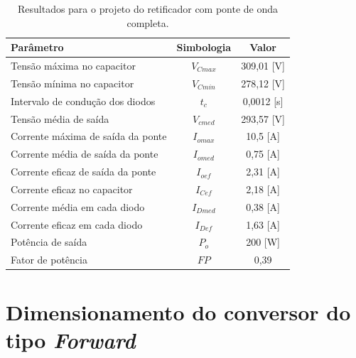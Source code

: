 \begin{apendicesenv}
\begin{table}[H]
    \centering
    \caption{Resultados para o projeto do retificador com ponte de onda completa.}
    \label{retificador_resultados}
    \begin{adjustbox}{max width = \textwidth}
        \begin{tabular}{|l|c|c|}
            \hline
            \rowcolor[HTML]{A8DADC}
            \textbf{Parâmetro} & \textbf{Simbologia} & \textbf{Valor}
            \\ \hline
            Tensão máxima no capacitor & $V_{Cmax}$ &  309,01 [V]
             \\ \hline
            Tensão mínima no capacitor & $V_{Cmin}$ &  278,12 [V]
             \\ \hline
            Intervalo de condução dos diodos & $t_{c}$ &  0,0012 [s]
             \\ \hline
            Tensão média de saída & $V_{cmed}$ & 293,57 [V]
             \\ \hline
            Corrente máxima de saída da ponte & $I_{omax}$ & 10,5 [A]
             \\ \hline
            Corrente média de saída da ponte & $I_{omed}$ &  0,75 [A]
             \\ \hline
            Corrente eficaz de saída da ponte & $I_{oef}$ & 2,31 [A]
             \\ \hline
            Corrente eficaz no capacitor & $I_{Cef}$ &  2,18 [A]
             \\ \hline
            Corrente média em cada diodo & $I_{Dmed}$ &  0,38 [A]
             \\ \hline
            Corrente eficaz em cada diodo & $I_{Def}$ & 1,63 [A]
             \\ \hline
            Potência de saída & $P_{o}$ &  200 [W]
             \\ \hline
            Fator de potência & $FP$ &  0,39
             \\ \hline
        \end{tabular}
    \end{adjustbox}
\end{table}

\section{Dimensionamento do conversor do tipo \textit{Forward}}


\end{apendicesenv}
